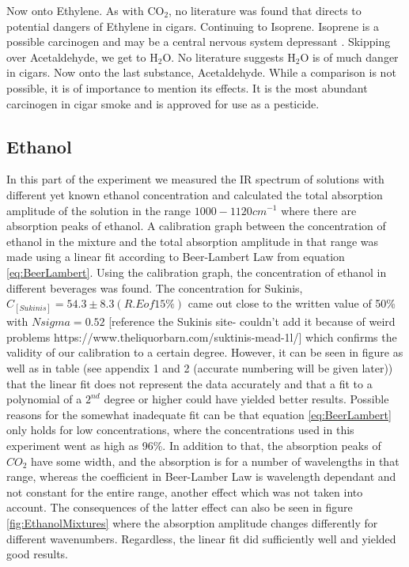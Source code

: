 \documentclass[reprint,amsmath,amssymb,aps, prl]{revtex4-2}
\begin{document}
Now onto Ethylene. As with $\text{CO}_2$, no literature was found that directs to potential dangers of Ethylene in cigars.
Continuing to Isoprene. Isoprene is a possible carcinogen and may be a central nervous system depressant \cite{PubChemIsoprene}.
Skipping over Acetaldehyde, we get to $\text{H}_2\text{O}$. No literature suggests $\text{H}_2\text{O}$ is of much danger in cigars.
Now onto the last substance, Acetaldehyde. While a comparison is not possible, it is of importance to mention its effects. It is the most abundant carcinogen in cigar smoke and is approved for use as a pesticide.

\subsection{Ethanol}
In this part of the experiment we measured the IR spectrum of solutions with different yet known ethanol concentration and calculated the total absorption amplitude of the solution in the range $1000-1120 cm^{-1}$ where there are absorption peaks of ethanol. A calibration graph between the concentration of ethanol in the mixture and the total absorption amplitude in that range was made using a linear fit according to Beer-Lambert Law from equation \ref{eq:BeerLambert}.
Using the calibration graph, the concentration of ethanol in different beverages was found. The concentration for Sukinis, $C_[Sukinis]=54.3\pm8.3 (R.E of 15\%)$ came out close to the written value of 50\% with $N{sigma}=0.52$  [reference the Sukinis site- couldn't add it because of weird problems https://www.theliquorbarn.com/suktinis-mead-1l/] which confirms the validity of our calibration to a certain degree. However, it can be seen in figure %
as well as in table 
(see appendix 1 and 2 (accurate numbering will be given later)) that the linear fit does not represent the data accurately and that a fit to a polynomial of a $2^{nd}$ degree or higher could have yielded better results. Possible reasons for the somewhat inadequate fit can be that equation \ref{eq:BeerLambert} only holds for low concentrations, where the concentrations used in this experiment went as high as 96\%. In addition to that, the absorption peaks of $CO_{2}$ have some width, and the absorption is for a number of wavelengths in that range, whereas the coefficient in Beer-Lamber Law is wavelength dependant and not constant for the entire range, another effect which was not taken into account. The consequences of the latter effect can also be seen in figure \ref{fig:EthanolMixtures} where the absorption amplitude changes differently for different wavenumbers. Regardless, the linear fit did sufficiently well and yielded good results.



\end{document}

